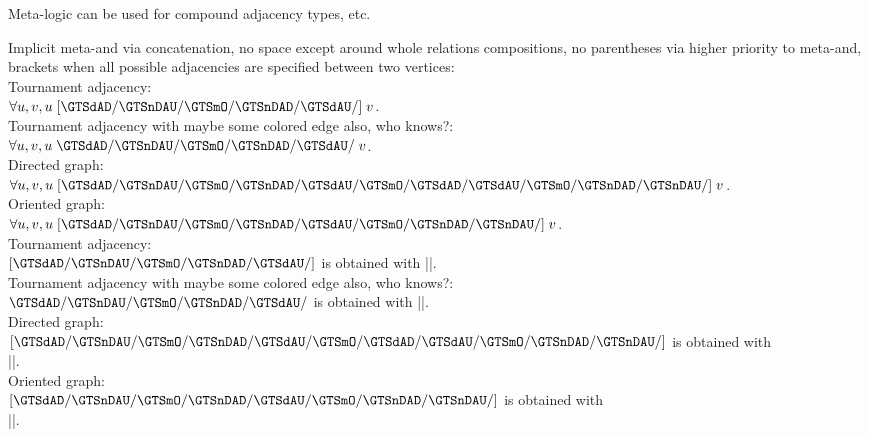 Meta-logic can be used for compound adjacency types, etc.

Implicit meta-and via concatenation,
no space except around whole relations compositions,
no parentheses via higher priority to meta-and, brackets when all possible
adjacencies are specified between two vertices:\\
Tournament adjacency:\\
$\forall u,v,
u \mathrel{[\GTSdAD/\GTSnDAU/\GTSmO/\GTSnDAD/\GTSdAU/]} v$.\\
Tournament adjacency with maybe some colored edge also, who knows?:\\
$\forall u,v,
u \mathrel{\GTSdAD/\GTSnDAU/\GTSmO/\GTSnDAD/\GTSdAU/} v$.\\
Directed graph:\\
$\forall u,v,
u \mathrel{[\GTSdAD/\GTSnDAU/\GTSmO/\GTSnDAD/\GTSdAU/
\GTSmO/\GTSdAD/\GTSdAU/\GTSmO/\GTSnDAD/\GTSnDAU/]} v$.\\
Oriented graph:\\
$\forall u,v,
u \mathrel{[\GTSdAD/\GTSnDAU/\GTSmO/\GTSnDAD/\GTSdAU/
\GTSmO/\GTSnDAD/\GTSnDAU/]} v$.\\
Tournament adjacency:\\
$\mathrel{[\GTSdAD/\GTSnDAU/\GTSmO/\GTSnDAD/\GTSdAU/]}$
is obtained with |\mathrel{[\GTSdAD/\GTSnDAU/\GTSmO/\GTSnDAD/\GTSdAU/]}|.\\
Tournament adjacency with maybe some colored edge also, who knows?:\\
$\mathrel{\GTSdAD/\GTSnDAU/\GTSmO/\GTSnDAD/\GTSdAU/}$
is obtained with |\mathrel{\GTSdAD/\GTSnDAU/\GTSmO/\GTSnDAD/\GTSdAU/}|.\\
Directed graph:\\
$\mathrel{[\GTSdAD/\GTSnDAU/\GTSmO/\GTSnDAD/\GTSdAU/
\GTSmO/\GTSdAD/\GTSdAU/\GTSmO/\GTSnDAD/\GTSnDAU/]}$ is obtained with\\
|\mathrel{[\GTSdAD/\GTSnDAU/\GTSmO/\GTSnDAD/\GTSdAU/|\\
|\GTSmO/\GTSdAD/\GTSdAU/\GTSmO/\GTSnDAD/\GTSnDAU/]}|.\\
Oriented graph:\\
$\mathrel{[\GTSdAD/\GTSnDAU/\GTSmO/\GTSnDAD/\GTSdAU/
\GTSmO/\GTSnDAD/\GTSnDAU/]}$ is obtained with\\
|\mathrel{[\GTSdAD/\GTSnDAU/\GTSmO/\GTSnDAD/\GTSdAU/|%
|\GTSmO/\GTSnDAD/\GTSnDAU/]}|.

